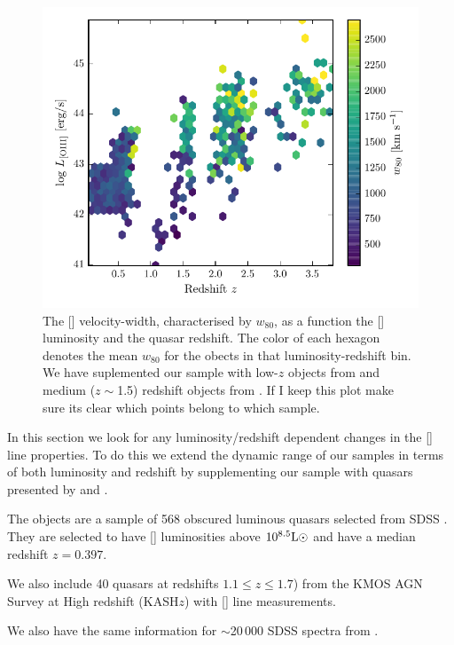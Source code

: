 \begin{figure}
    \includegraphics[width=\columnwidth]{figures/chapter04/oiii_luminosity_z_w80.pdf} 
    \caption{The [] velocity-width, characterised by $w_{80}$, as a function the [] luminosity and the quasar redshift. The color of each hexagon denotes the mean $w_{80}$ for the obects in that luminosity-redshift bin. We have suplemented our sample with low-$z$ objects from \citet{zakamska14} and medium ($z\sim$1.5) redshift objects from \citet{harrison16}. If I keep this plot make sure its clear which points belong to which sample.}       
    \label{fig:oiii_luminosity_z_w80}
\end{figure}

In this section we look for any luminosity/redshift dependent changes in the [] line properties. 
To do this we extend the dynamic range of our samples in terms of both luminosity and redshift by supplementing our sample with quasars presented by \citet{zakamska14} and \citet{harrison16}. 

The \citet{zakamska14} objects are a sample of 568 obscured luminous quasars selected from SDSS \citep{reyes08,yuan16}. 
They are selected to have [] luminosities above $10^{8.5}{\rm L}\odot$ and have a median redshift $z=0.397$. 

We also include 40 quasars at redshifts $1.1 \leq z \leq 1.7$) from the KMOS AGN Survey at High redshift (KASH$z$) with [] line measurements. 

We also have the same information for $\sim$20\,000 SDSS spectra from \citet{mullaney13}. 

